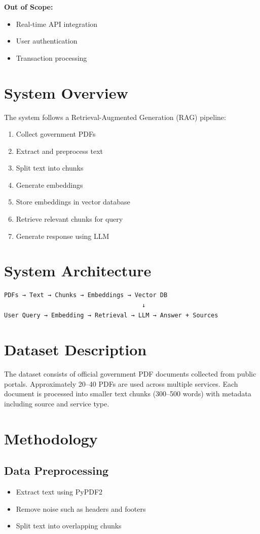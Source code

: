 \documentclass[11pt]{article}
\begin{document}
\textbf{Out of Scope:}
\begin{itemize}
    \item Real-time API integration
    \item User authentication
    \item Transaction processing
\end{itemize}

\section{System Overview}
The system follows a Retrieval-Augmented Generation (RAG) pipeline:
\begin{enumerate}
    \item Collect government PDFs
    \item Extract and preprocess text
    \item Split text into chunks
    \item Generate embeddings
    \item Store embeddings in vector database
    \item Retrieve relevant chunks for query
    \item Generate response using LLM
\end{enumerate}

\section{System Architecture}
\begin{verbatim}
PDFs → Text → Chunks → Embeddings → Vector DB
                                      ↓
User Query → Embedding → Retrieval → LLM → Answer + Sources
\end{verbatim}

\section{Dataset Description}
The dataset consists of official government PDF documents collected from public portals. Approximately 20--40 PDFs are used across multiple services. Each document is processed into smaller text chunks (300--500 words) with metadata including source and service type.

\section{Methodology}

\subsection{Data Preprocessing}
\begin{itemize}
    \item Extract text using PyPDF2
    \item Remove noise such as headers and footers
    \item Split text into overlapping chunks
\end{itemize}
\end{document}

